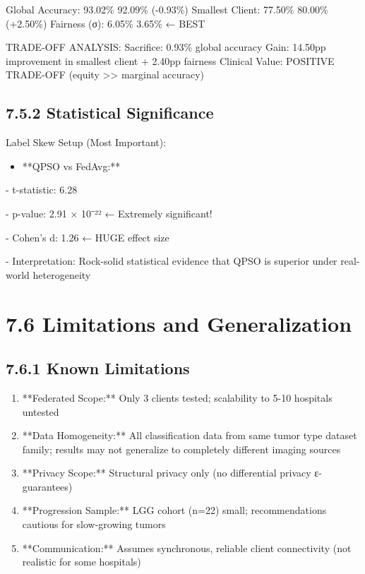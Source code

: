 Global Accuracy:    93.02\%                                92.09\% (-0.93\%)
Smallest Client:    77.50\%                                80.00\% (+2.50\%)
Fairness (σ):       6.05\%                                 3.65\%  ← BEST

TRADE-OFF ANALYSIS:
  Sacrifice: 0.93\% global accuracy
  Gain: 14.50pp improvement in smallest client + 2.40pp fairness
  Clinical Value: POSITIVE TRADE-OFF (equity >> marginal accuracy)


\subsection{7.5.2 Statistical Significance}
Label Skew Setup (Most Important):

\begin{itemize}
  \item **QPSO vs FedAvg:**
\end{itemize}

- t-statistic: 6.28

- p-value: 2.91 × 10⁻²² ← Extremely significant!

- Cohen's d: 1.26 ← HUGE effect size

- Interpretation: Rock-solid statistical evidence that QPSO is superior under real-world heterogeneity


\section{7.6 Limitations and Generalization}

\subsection{7.6.1 Known Limitations}
\begin{enumerate}
  \item **Federated Scope:** Only 3 clients tested; scalability to 5-10 hospitals untested
  \item **Data Homogeneity:** All classification data from same tumor type dataset family; results may not generalize to completely different imaging sources
  \item **Privacy Scope:** Structural privacy only (no differential privacy ε-guarantees)
  \item **Progression Sample:** LGG cohort (n=22) small; recommendations cautious for slow-growing tumors
  \item **Communication:** Assumes synchronous, reliable client connectivity (not realistic for some hospitals)
\end{enumerate}


